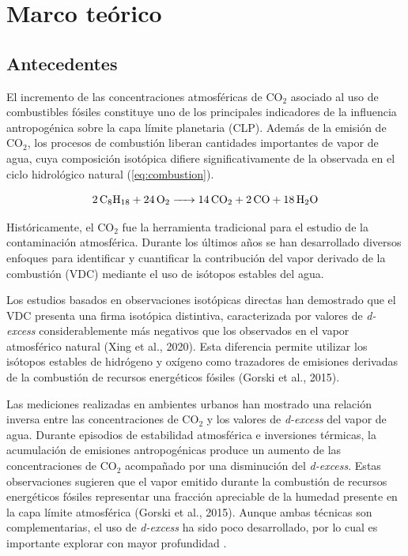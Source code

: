 \chapter{Marco teórico}
\section{Antecedentes}
El incremento de las concentraciones atmosféricas de CO$_2$ asociado al 
uso de combustibles fósiles constituye uno de los principales indicadores
de la influencia antropogénica sobre la capa límite planetaria (CLP). Además de la emisión 
de CO$_2$, los procesos de combustión liberan cantidades importantes de 
vapor de agua, cuya composición isotópica difiere significativamente de la 
observada en el ciclo hidrológico natural (\ref{eq:combustion}). 

\begin{equation}
\ce{2C8H18 + 24O2 -> 14CO2 + 2CO + 18H2O}
\label{eq:combustion}
\end{equation}

Históricamente, el CO$_2$ fue la herramienta tradicional para el estudio de 
la contaminación atmosférica. Durante 
los últimos años se han desarrollado diversos enfoques para identificar y 
cuantificar la contribución del vapor derivado de la combustión (VDC) mediante 
el uso de isótopos estables del agua.

Los estudios basados en observaciones isotópicas directas han demostrado
que el VDC presenta una firma isotópica distintiva, caracterizada por valores 
de \textit{d-excess} considerablemente más negativos que los observados en el vapor 
atmosférico natural (Xing et al., 2020). Esta diferencia permite utilizar los isótopos estables 
de hidrógeno y oxígeno como trazadores de emisiones derivadas de la combustión 
de recursos energéticos fósiles (Gorski et al., 2015).

Las mediciones realizadas en ambientes urbanos han mostrado una relación
inversa entre las concentraciones de CO$_2$ y los valores de \textit{d-excess} del
vapor de agua. Durante episodios de estabilidad atmosférica e inversiones 
térmicas, la acumulación de emisiones antropogénicas produce un aumento de las
concentraciones de CO$_2$ acompañado por una disminución del \textit{d-excess}. Estas 
observaciones sugieren que el vapor emitido durante la combustión de recursos 
energéticos fósiles 
representar una fracción apreciable de la humedad presente en la capa límite 
atmosférica (Gorski et al., 2015). Aunque ambas técnicas son complementarias, el uso 
de \textit{d-excess} ha sido poco desarrollado, por lo cual es 
importante explorar con mayor profundidad .

